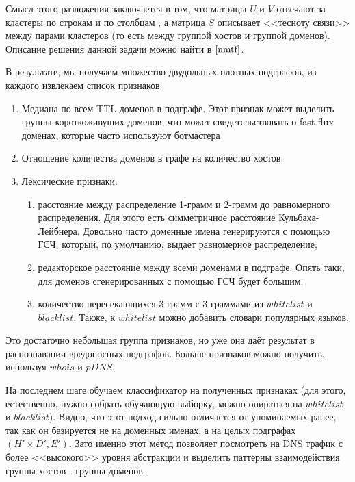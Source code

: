 \documentclass[a4paper,14pt]{extreport} %
\begin{document}
Смысл этого разложения заключается в том, что матрицы $U$ и $V$ отвечают за кластеры по строкам и по столбцам , а матрица $S$ описывает <<тесноту связи>> между парами кластеров (то есть между группой хостов и группой доменов). Описание решения данной задачи можно найти в $\cite{nmtf}$.
	
В результате, мы получаем множество двудольных плотных подграфов, из каждого извлекаем список признаков
	
\begin{enumerate}
	\item Медиана по всем TTL доменов в подграфе. Этот признак может выделить группы короткоживущих доменов, что может свидетельствовать о fast-flux доменах, которые часто используют ботмастера
	\item Отношение количества доменов в графе на количество хостов
	\item Лексические признаки:
	      \begin{enumerate}[а)]
	      		      
	      	\item расстояние между распределение 1-грамм и 2-грамм до равномерного распределения. Для этого есть симметричное расстояние Кульбаха-Лейбнера. Довольно часто доменные имена генерируются с помощью ГСЧ, который, по умолчанию, выдает равномерное распределение;
	      	\item редакторское расстояние между всеми доменами в подграфе. Опять таки, для доменов сгенерированных с помощью ГСЧ будет большим;
	      	\item количество пересекающихся 3-грамм с 3-граммами из $whitelist$ и $blacklist$. Также, к $whitelist$ можно добавить словари популярных языков.
	      \end{enumerate}
\end{enumerate}  

Это достаточно небольшая группа признаков, но уже она даёт результат в распознавании вредоносных подграфов. Больше признаков можно получить, используя $whois$ и $pDNS$.
	
На последнем шаге обучаем классификатор на полученных признаках (для этого, естественно, нужно собрать обучающую выборку, можно опираться на $whitelist$ и $blacklist$). Видно, что этот подход сильно отличается от упоминаемых ранее, так как он базируется не на доменных именах, а на целых подграфах $(H' \times D', E')$. Зато именно этот метод позволяет посмотреть на DNS трафик с более <<высокого>> уровня абстракции и выделить паттерны взаимодействия группы хостов - группы доменов.
	
\end{document}

